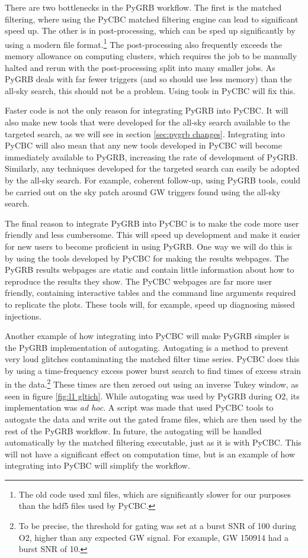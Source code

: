 \documentclass[11pt]{cuthesis}
\begin{document}
There are two bottlenecks in the PyGRB workflow. The first is the matched filtering, where using the PyCBC matched filtering engine can lead to significant speed up. The other is in post-processing, which can be sped up significantly by using a modern file format.\footnote{The old code used xml files, which are significantly slower for our purposes than the hdf5 files used by PyCBC.} The post-processing also frequently exceeds the memory allowance on computing clusters, which requires the job to be manually halted and rerun with the post-processing split into many smaller jobs. As PyGRB deals with far fewer triggers (and so should use less memory) than the all-sky search, this should not be a problem. Using tools in PyCBC will fix this. 

Faster code is not the only reason for integrating PyGRB into PyCBC. It will also make new tools that were developed for the all-sky search available to the targeted search, as we will see in section \ref{sec:pygrb changes}.  Integrating into PyCBC will also mean that any new tools developed in PyCBC will become immediately available to PyGRB, increasing the rate of development of PyGRB. Similarly, any techniques developed for the targeted search can easily be adopted by the all-sky search. For example, coherent follow-up, using PyGRB tools, could be carried out on the sky patch around GW triggers found using the all-sky search.

The final reason to integrate PyGRB into PyCBC is to make the code more user friendly and less cumbersome. This will speed up development and make it easier for new users to become proficient in using PyGRB. One way we will do this is by using the tools developed by PyCBC for making the results webpages. The PyGRB results webpages are static and contain little information about how to reproduce the results they show. The PyCBC webpages are far more user friendly, containing interactive tables and the command line arguments required to replicate the plots. These tools will, for example, speed up diagnosing missed injections. 

Another example of how integrating into PyCBC will make PyGRB simpler is the PyGRB implementation of autogating. Autogating is a method to prevent very loud glitches contaminating the matched filter time series. PyCBC does this by using a time-frequency excess power burst search \cite{GW150914_searches,omicron} to find times of excess strain in the data.\footnote{To be precise, the threshold for gating was set at a burst SNR of 100 during O2, higher than any expected GW signal. For example, GW 150914 had a burst SNR of 10.} These times are then zeroed out using an inverse Tukey window, as seen in figure \ref{fig:l1 gltich}.  While autogating was used by PyGRB during O2, its implementation was \textit{ad hoc}. A script was made that used PyCBC tools to autogate the data and write out the gated frame files, which are then used by the rest of the PyGRB workflow. In future, the autogating will be handled automatically by the matched filtering executable, just as it is with PyCBC. This will not have a significant effect on computation time, but is an example of how integrating into PyCBC will simplify the workflow.
\end{document}
